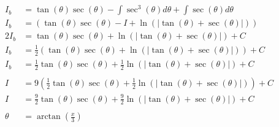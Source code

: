 \documentclass[12pt]{article}
\begin{document}
\begin{align}
    I_b                                              & = \tan(\theta)\sec(\theta) - \int \sec^3(\theta) d\theta + \int \sec(\theta) d\theta                                                              \\
    I_b                                              & = \left( \tan(\theta)\sec(\theta) - I + \ln(|\tan(\theta)+\sec(\theta)|) \right)                                                                  \\
    2I_b                                             & = \tan(\theta)\sec(\theta) + \ln(|\tan(\theta)+\sec(\theta)|) + C                                                                                 \\
    I_b                                              & = \frac{1}{2}(\tan(\theta)\sec(\theta) + \ln(|\tan(\theta)+\sec(\theta)|)) + C                                                                    \\
    I_b                                              & = \frac{1}{2}\tan(\theta)\sec(\theta) + \frac{1}{2}\ln(|\tan(\theta)+\sec(\theta)|) + C                                                           \\
    \nonumber                                                                                                                                                                                            \\
    I                                                & = 9\left(\frac{1}{2}\tan(\theta)\sec(\theta) + \frac{1}{2}\ln(|\tan(\theta)+\sec(\theta)|)\right) + C                                             \\
    I                                                & = \frac{9}{2}\tan(\theta)\sec(\theta) + \frac{9}{2}\ln(|\tan(\theta)+\sec(\theta)|) + C                                                           \\
    \nonumber                                                                                                                                                                                            \\
    \theta                                           & = \arctan\left(\frac{x}{3}\right)                                                                                                                 \\
    \nonumber                                                                                                                                                                                            \\

\end{align}
\end{document}
